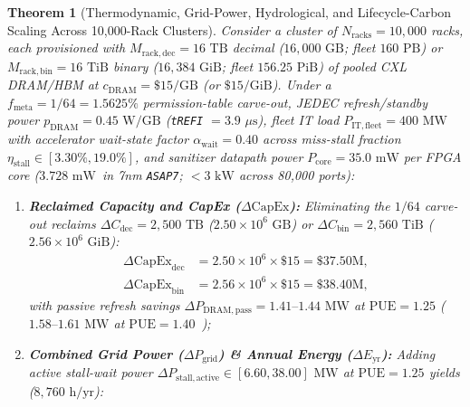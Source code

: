 \documentclass[11pt,letterpaper]{article}
\providecommand{\AsicTotalPowerMw}{\ensuremath{3.728\text{~mW}}}
\theoremstyle{spectralthm}
\newtheorem{theorem}{Theorem}[section]
\begin{document}
\begin{theorem}[Thermodynamic, Grid-Power, Hydrological, and Lifecycle-Carbon Scaling Across 10,000-Rack Clusters]
\label{thm:thermo_env}
\label{thm:cluster_thermodynamics}
Consider a cluster of $N_{\mathrm{racks}} = 10,000$ racks, each provisioned with $M_{\mathrm{rack,dec}} = 16\text{~TB}$ decimal ($16,000\text{~GB}$; fleet $160\text{~PB}$) or $M_{\mathrm{rack,bin}} = 16\text{~TiB}$ binary ($16,384\text{~GiB}$; fleet $156.25\text{~PiB}$) of pooled CXL DRAM/HBM at $c_{\mathrm{DRAM}} = \$15/\text{GB}$ (or $\$15/\text{GiB}$). Under a $f_{\mathrm{meta}} = 1/64 = 1.5625\%$ permission-table carve-out, JEDEC refresh/standby power $p_{\mathrm{DRAM}} = 0.45\text{~W/GB}$ (\texttt{tREFI} $= 3.9\text{~}\mu\text{s}$), fleet IT load $P_{\mathrm{IT,fleet}} = 400\text{~MW}$ with accelerator wait-state factor $\alpha_{\mathrm{wait}} = 0.40$ across miss-stall fraction $\eta_{\mathrm{stall}} \in [3.30\%, 19.0\%]$, and sanitizer datapath power $P_{\mathrm{core}} = 35.0\text{~mW}$ per FPGA core (\AsicTotalPowerMw\ in 7nm \texttt{ASAP7}; $< 3\text{~kW}$ across 80,000 ports):
\begin{enumerate}
  \item[(i)] \textbf{Reclaimed Capacity and CapEx ($\Delta\mathrm{CapEx}$):} Eliminating the $1/64$ carve-out reclaims $\Delta C_{\mathrm{dec}} = 2,500\text{~TB}$ ($2.50 \times 10^6\text{~GB}$) or $\Delta C_{\mathrm{bin}} = 2,560\text{~TiB}$ ($2.56 \times 10^6\text{~GiB}$):
  \begin{equation}
  \label{eq:tco_dec_bin}
  \begin{aligned}
  \Delta\mathrm{CapEx}_{\mathrm{dec}} &= 2.50\times 10^6 \times \$15 = \$37.50\text{M},\\
  \Delta\mathrm{CapEx}_{\mathrm{bin}} &= 2.56\times 10^6 \times \$15 = \$38.40\text{M},
  \end{aligned}
  \end{equation}
  with passive refresh savings $\Delta P_{\mathrm{DRAM,pass}} = 1.41\text{--}1.44\text{~MW}$ at $\mathrm{PUE}=1.25$ ($1.58\text{--}1.61\text{~MW}$ at $\mathrm{PUE}=1.40$~\cite{shehabi2024lbnl});
  \item[(ii)] \textbf{Combined Grid Power ($\Delta P_{\mathrm{grid}}$) \& Annual Energy ($\Delta E_{\mathrm{yr}}$):} Adding active stall-wait power $\Delta P_{\mathrm{stall,active}} \in [6.60, 38.00]\text{~MW}$ at $\mathrm{PUE} = 1.25$ yields ($8,760\text{~h/yr}$):
  \begin{equation}
  \label{eq:thermo_total_energy}
  \begin{aligned}

\end{aligned}
\end{equation}
\end{enumerate}
\end{theorem}
\end{document}
